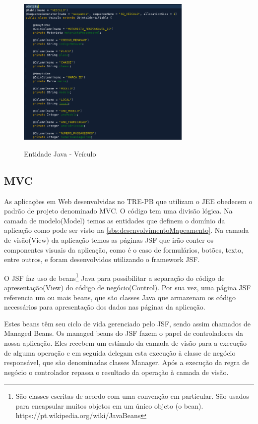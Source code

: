 \begin{figure}[!htb]
    \centering
    \caption{Entidade Java - Veículo}
    \includegraphics[width=0.75\textwidth]{dados/figuras/entidade.png}
    \label{fig:figura-entidade}
\end{figure}

\subsection{MVC}
\label{sbs:desenvolvimentoMVC}

As aplicações em Web desenvolvidas no TRE-PB que utilizam o JEE obedecem o padrão de projeto denominado MVC. O código tem uma divisão lógica. 
Na camada de modelo(Model) temos as entidades que definem o domínio da aplicação como pode ser visto na \autoref{sbs:desenvolvimentoMapeamento}. 
Na camada de visão(View) da aplicação temos as páginas JSF que irão conter os componentes visuais da aplicação, como é o caso de formulários, botões, texto, entre outros, e foram desenvolvidos utilizando o framework JSF. 

O JSF faz uso de beans\footnote{São classes escritas de acordo com uma convenção em particular. São usados para encapsular muitos objetos em um único objeto (o bean). https://pt.wikipedia.org/wiki/JavaBeans} Java para possibilitar a separação do código de apresentação(View) do código de negócio(Control). Por sua vez, uma página JSF referencia um ou mais beans, que são classes Java que armazenam os código necessários para apresentação dos dados nas páginas da aplicação. 

Estes beans têm seu ciclo de vida gerenciado pelo JSF, sendo assim chamados de Managed Beans.
Os managed beans do JSF fazem o papel de controladores da nossa aplicação. Eles recebem um estímulo da camada de visão para a execução de alguma operação e em seguida delegam esta execução à classe de negócio responsável, que são denominadas classes Manager. Após a execução da regra de negócio o controlador repassa o resultado da operação à camada de visão.

